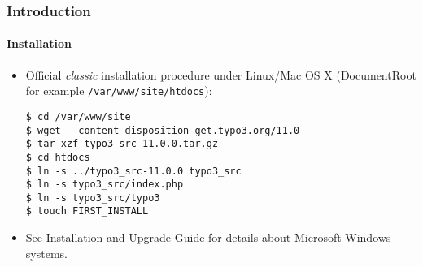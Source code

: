 %

\begin{frame}[fragile]
	\frametitle{Introduction}
	\framesubtitle{Installation}


	\begin{itemize}
		\item Official \textit{classic} installation procedure under Linux/Mac OS X\newline
			(DocumentRoot for example \texttt{/var/www/site/htdocs}):
\begin{lstlisting}
$ cd /var/www/site
$ wget --content-disposition get.typo3.org/11.0
$ tar xzf typo3_src-11.0.0.tar.gz
$ cd htdocs
$ ln -s ../typo3_src-11.0.0 typo3_src
$ ln -s typo3_src/index.php
$ ln -s typo3_src/typo3
$ touch FIRST_INSTALL
\end{lstlisting}

		\item See \href{https://docs.typo3.org/m/typo3/guide-installation/master/en-us/}{Installation and Upgrade Guide}
			for details about Microsoft Windows systems.

	\end{itemize}
\end{frame}


